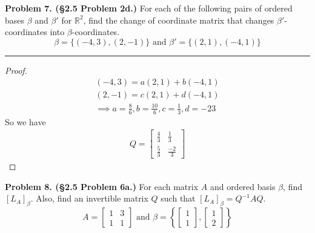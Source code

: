 \documentclass[leqno]{article}
\theoremstyle{nonumberplain}
\newtheorem{proof}{Proof}
\begin{document}


\noindent\textbf{Problem 7. (\S 2.5 Problem 2d.)} For each of the following pairs of ordered bases $\beta$ and $\beta'$ for $\mathbb{R}^2$, find the change of coordinate matrix that changes $\beta'$-coordinates into $\beta$-coordinates.
\[
\beta = \{(-4,3),(2,-1)\} \textrm{ and } \beta' = \{(2,1),(-4,1)\}
\]

\noindent\rule[0.5ex]{\linewidth}{1pt}

\begin{proof}
\begin{align*}
(-4,3)=a(2,1)+b(-4,1)\\
(2,-1)=c(2,1)+d(-4,1)\\
\implies a=\frac{8}{6},b=\frac{10}{6},c=\frac{1}{3},d={-2}{3}
\end{align*}
So we have
\begin{align*}
Q=
\begin{bmatrix}
\frac{4}{3} & \frac{1}{3}\\
\frac{5}{3} & \frac{-2}{3}
\end{bmatrix}
\end{align*}
\end{proof}

\pagebreak




\noindent\textbf{Problem 8. (\S 2.5 Problem 6a.)} For each matrix $A$ and ordered basis $\beta$, find $[L_A]_\beta$. Also, find an invertible matrix $Q$ such that $[L_A]_\beta = Q^{-1} A Q$. 
\[
A=
\begin{bmatrix}
1 & 3\\
1 & 1
\end{bmatrix} \textrm{ and } 
\beta=
\left\{
\begin{bmatrix}
1\\
1
\end{bmatrix},
\begin{bmatrix}
1\\
2
\end{bmatrix}
\right\}
\]
\end{document}
